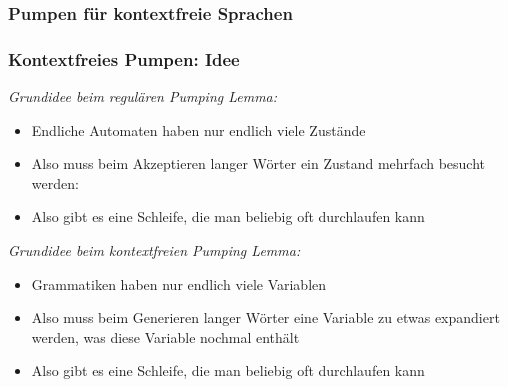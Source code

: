 \documentclass[onlymath]{beamer}
\begin{document}
\begin{frame}\frametitle{Pumpen für kontextfreie Sprachen}

\medskip\pause


\end{frame}

\begin{frame}\frametitle{Kontextfreies Pumpen: Idee}

\emph{Grundidee beim regulären Pumping Lemma:}
\begin{itemize}
\item Endliche Automaten haben nur endlich viele Zustände
\item Also muss beim Akzeptieren langer Wörter ein Zustand mehrfach besucht werden:\\
\item Also gibt es eine Schleife, die man beliebig oft durchlaufen kann
\end{itemize}
\bigskip\pause

\emph{Grundidee beim kontextfreien Pumping Lemma:}
\begin{itemize}
\item Grammatiken haben nur endlich viele Variablen
\item Also muss beim Generieren langer Wörter eine Variable zu etwas expandiert werden, was diese Variable nochmal enthält\ghost{:}\\
\item Also gibt es eine Schleife, die man beliebig oft durchlaufen kann
\end{itemize}

\end{frame}
\end{document}
